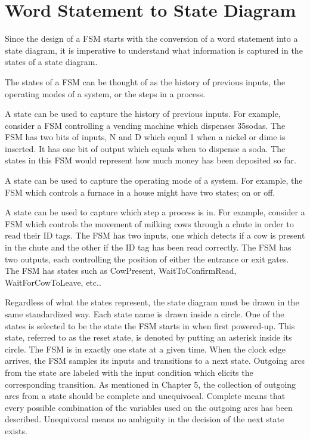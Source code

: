 \section{Word Statement to State Diagram}

Since the design of a FSM starts with the conversion of a word statement into
a state diagram, it is imperative to understand what information is captured
in the states of a state diagram.

The states of a FSM can be thought of as the history of previous 
inputs, the operating modes of a system, or the steps in a process.

A state can be used to capture the history of previous inputs.  For example, 
consider a FSM controlling a vending machine which dispenses 
35\textcent sodas.  The
FSM has two bits of inputs, N and D which equal 1 when a nickel or dime is 
inserted.  It has one bit of output which equals when to dispense a soda.  The
states in this FSM would represent how much money has been deposited so far.

A state can be used to capture the operating mode of a system.  For example,
the FSM which controls a furnace in a house might have two states;
on or off.

A state can be used to capture which step a process is in.  For example, 
consider a FSM which controls the movement of milking cows through a chute
in order to read their ID tags.  The FSM has two inputs, one which detects 
if a cow is present in the chute and the other if the ID tag has been
read correctly. The FSM has two outputs, each controlling the position of either
the entrance or exit gates.  The FSM has states such as CowPresent,
WaitToConfirmRead, WaitForCowToLeave, etc..

Regardless of what the states represent, the state diagram must be drawn in the 
same standardized way.  Each state name is drawn inside a circle.  
One of the states is selected to be the state the FSM starts in when 
first powered-up.  This state, referred to as the reset state, is 
denoted by putting an asterisk inside its 
circle.  The FSM is in exactly one state at a given time.  When the clock edge 
arrives, the FSM samples its inputs and transitions to a next state.  Outgoing
arcs from the state are labeled with the input condition which elicits the
corresponding transition.  As mentioned in Chapter 5, the collection of 
outgoing arcs from a state should be complete and unequivocal.  Complete means
that every possible combination of the variables used on the outgoing arcs has 
been described.  Unequivocal means  no ambiguity in the decision of 
the next state exists.

